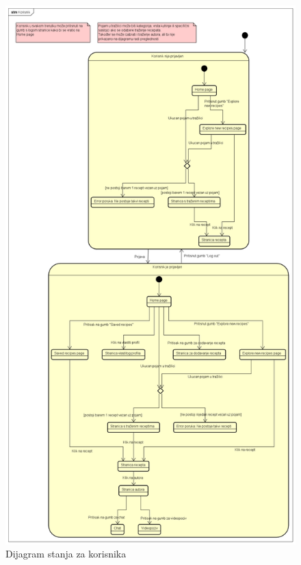 		\eject
			
			\begin{figure}[H]
				\centering
				\includegraphics[height=0.95\textheight]{slike/dijagrami/Korisnik_dijagram_stanja.png}
				\caption{Dijagram stanja za korisnika}
				\label{fig:enter-label}
			\end{figure}
			
			
			\eject 
		
